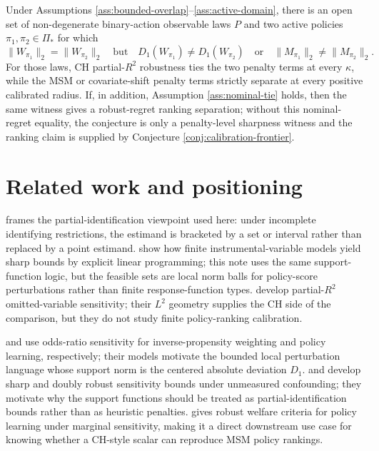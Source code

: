\documentclass[11pt]{article}
\theoremstyle{definition}
\theoremstyle{plain}
\theoremstyle{remark}
\begin{document}
\begin{conjecture}\label{conj:open-set-witness}
Under Assumptions \ref{ass:bounded-overlap}--\ref{ass:active-domain}, there is an open set of non-degenerate binary-action observable laws $P$ and two active policies $\pi_1,\pi_2\in\Pi_\ast$ for which
\[
  \|W_{\pi_1}\|_2=\|W_{\pi_2}\|_2
  \quad\text{but}\quad
  D_1(W_{\pi_1})\ne D_1(W_{\pi_2})
  \quad\text{or}\quad
  \|M_{\pi_1}\|_2\ne\|M_{\pi_2}\|_2.
\]
For those laws, CH partial-$R^2$ robustness ties the two penalty terms at every $\kappa$, while the MSM or covariate-shift penalty terms strictly separate at every positive calibrated radius.  If, in addition, Assumption \ref{ass:nominal-tie} holds, then the same witness gives a robust-regret ranking separation; without this nominal-regret equality, the conjecture is only a penalty-level sharpness witness and the ranking claim is supplied by Conjecture \ref{conj:calibration-frontier}.
\end{conjecture}

\section{Related work and positioning}
\cite{Manski1990} frames the partial-identification viewpoint used here: under incomplete
identifying restrictions, the estimand is bracketed by a set or interval rather than
replaced by a point estimand.  \cite{BalkePearl1997} show how finite instrumental-variable
models yield sharp bounds by explicit linear programming; this note uses the same
support-function logic, but the feasible sets are local norm balls for policy-score
perturbations rather than finite response-function types.  \cite{CinelliHazlett2020}
develop partial-$R^2$ omitted-variable sensitivity; their $L^2$ geometry supplies the
CH side of the comparison, but they do not study finite policy-ranking calibration.

\cite{ZhaoSmallBhattacharya2019} and \cite{KallusZhou2021} use odds-ratio sensitivity
for inverse-propensity weighting and policy learning, respectively; their models motivate
the bounded local perturbation language whose support norm is the centered absolute
deviation $D_1$.  \cite{YadlowskyNamkoongBasuDuchiTian2022} and \cite{DornGuoKallus2025}
develop sharp and doubly robust sensitivity bounds under unmeasured confounding; they
motivate why the support functions should be treated as partial-identification bounds
rather than as heuristic penalties.  \cite{JinXuZhengZhou2025} gives robust welfare
criteria for policy learning under marginal sensitivity, making it a direct downstream
use case for knowing whether a CH-style scalar can reproduce MSM policy rankings.
\end{document}
